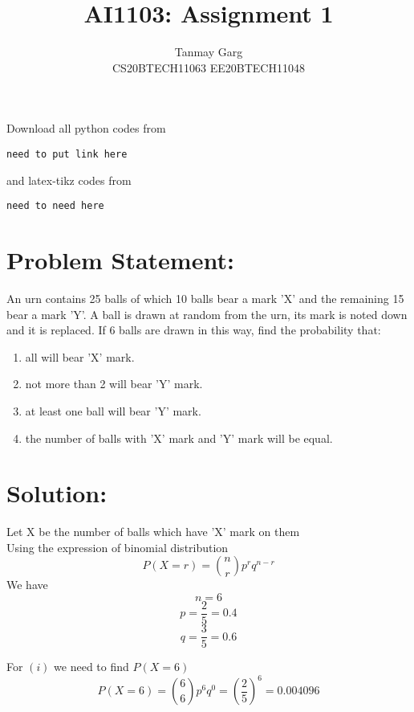 \documentclass[journal,12pt,twocolumn]{IEEEtran}
\begin{document}
     \def\rightbox#1{\makebox[0in][r]{#1}}
     \def\centbox#1{\makebox[0in]{#1}}
     \def\topbox#1{\raisebox{-\baselineskip}[0in][0in]{#1}}
     \def\midbox#1{\raisebox{-0.5\baselineskip}[0in][0in]{#1}}
\vspace{3cm}
\title{AI1103: Assignment 1}
\author{Tanmay Garg \\CS20BTECH11063 EE20BTECH11048}
\maketitle
\newpage
\bigskip
\renewcommand{\thefigure}{\theenumi}
\renewcommand{\thetable}{\theenumi}
Download all python codes from 
\begin{lstlisting}
need to put link here
\end{lstlisting}
%
and latex-tikz codes from 
%
\begin{lstlisting}
need to need here
\end{lstlisting}

\section*{Problem Statement: }
An urn contains 25 balls of which 10 balls
bear a mark ’X’ and the remaining 15 bear a
mark ’Y’.
A ball is drawn at random from the
urn, its mark is noted down and it is replaced.
If 6 balls are drawn in this way, find the
probability that:
\begin{enumerate}
    \item all will bear 'X' mark.
    \item not more than 2 will bear 'Y' mark.
    \item at least one ball will bear 'Y' mark.
    \item the number of balls with 'X' mark and 'Y' mark will be equal.
\end{enumerate}

\section*{Solution:}
Let X be the number of balls which have 'X' mark on them\\
Using the expression of binomial distribution
\[P(X = r) = {n \choose r} p^r q^{n-r}\]
We have
\[n = 6\]
\[p = \frac{2}{5} = 0.4\] 
\[q = \frac{3}{5} = 0.6\] 

For \((i)\) we need to find \(P(X = 6)\)
\[P(X = 6) = {6 \choose 6} p^6 q^0 = \left(\frac{2}{5} \right)^6 = 0.004096\]
\end{document}
